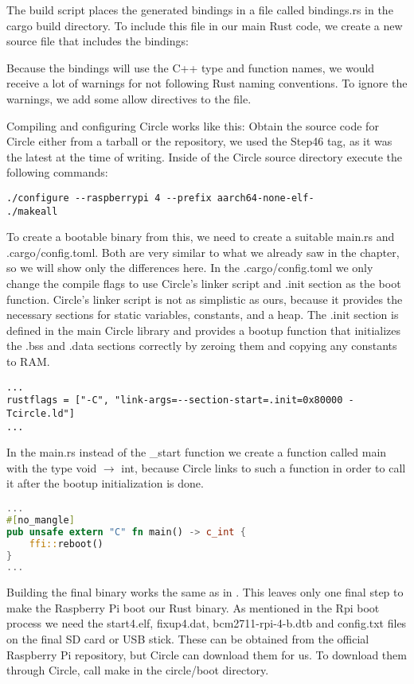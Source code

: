The build script places the generated bindings in a file called bindings.rs in the cargo build directory.
To include this file in our main Rust code, we create a new source file that includes the bindings:


Because the bindings will use the C++ type and function names, we would receive a lot of warnings for not following Rust naming conventions.
To ignore the warnings, we add some allow directives to the file.

Compiling and configuring Circle works like this:
Obtain the source code for Circle either from a tarball or the repository, we used the Step46 tag, as it was the latest at the time of writing.
Inside of the Circle source directory execute the following commands:
\begin{verbatim}
./configure --raspberrypi 4 --prefix aarch64-none-elf-
./makeall
\end{verbatim}

To create a bootable binary from this, we need to create a suitable main.rs and .cargo/config.toml.
Both are very similar to what we already saw in the  chapter, so we will show only the differences here.
In the .cargo/config.toml we only change the compile flags to use Circle's linker script and .init section as the boot function.
Circle's linker script is not as simplistic as ours, because it provides the necessary sections for static variables, constants, and a heap.
The .init section is defined in the main Circle library and provides a bootup function that initializes the .bss and .data sections correctly by zeroing them and copying any constants to RAM.
\begin{verbatim}
...
rustflags = ["-C", "link-args=--section-start=.init=0x80000 -Tcircle.ld"]
...
\end{verbatim}

In the main.rs instead of the \_start function we create a function called main with the type void $\rightarrow$ int,
because Circle links to such a function in order to call it after the bootup initialization is done.
\begin{lstlisting}[language=Rust,style=colouredRust]
...
#[no_mangle]
pub unsafe extern "C" fn main() -> c_int {
    ffi::reboot()
}
...
\end{lstlisting}

Building the final binary works the same as in .
This leaves only one final step to make the Raspberry Pi boot our Rust binary.
As mentioned in the Rpi boot process we need the start4.elf, fixup4.dat, bcm2711-rpi-4-b.dtb and config.txt files on the final SD card or USB stick.
These can be obtained from the official Raspberry Pi repository, but Circle can download them for us.
To download them through Circle, call make in the circle/boot directory.

